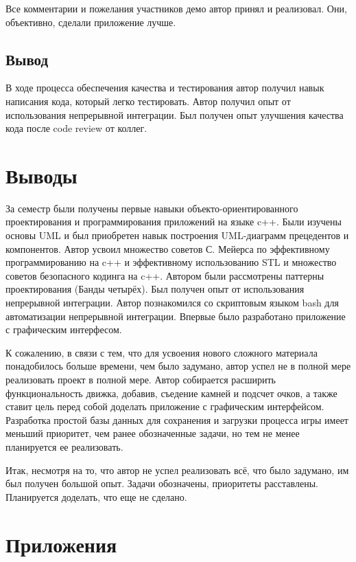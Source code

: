 Все комментарии и пожелания участников демо автор принял и реализовал. Они, объективно, сделали приложение лучше.

\subsection*{Вывод}

В ходе процесса обеспечения качества и тестирования автор получил навык написания кода, который легко тестировать. Автор получил опыт от использования непрерывной интеграции. Был получен опыт улучшения качества кода после code review от коллег.

\section*{Выводы}

За семестр были получены первые навыки объекто-ориентированного проектирования и программирования приложений на языке c++. Были изучены основы UML и был приобретен навык построения UML-диаграмм прецедентов и компонентов. Автор усвоил множество советов С. Мейерса по эффективному программированию на c++ и эффективному использованию STL и множество советов безопасного кодинга на c++. Автором были рассмотрены паттерны проектирования (Банды четырёх). Был получен опыт от использования непрерывной интеграции. Автор познакомился со скриптовым языком bash для автоматизации непрерывной интеграции. Впервые было разработано приложение с графическим интерфесом.

К сожалению, в связи с тем, что для усвоения нового сложного материала понадобилось больше времени, чем было задумано, автор успел не в полной мере реализовать проект в полной мере. Автор собирается расширить функциональность движка, добавив, съедение камней и подсчет очков, а также ставит цель перед собой доделать приложение с графическим интерфейсом. Разработка простой базы данных для сохранения и загрузки процесса игры имеет меньший приоритет, чем ранее обозначенные задачи, но тем не менее планируется ее реализовать.

Итак, несмотря на то, что автор не успел реализовать всё, что было задумано, им был получен большой опыт. Задачи обозначены, приоритеты расставлены. Планируется доделать, что еще не сделано.


\section*{Приложения}

